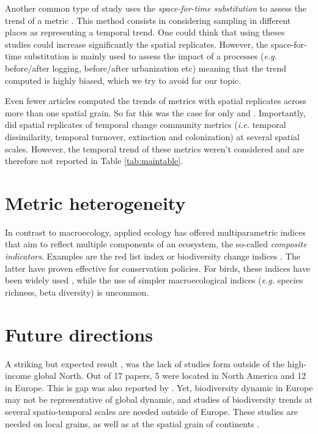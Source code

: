\documentclass[
  12pt,
  oneside]{report}
\begin{document}
Another common type of study uses the \emph{space-for-time substitution} \autocite{walker_use_2010} to assess the trend of a metric \autocite[one of the best example is][]{hill_determining_2004}. This method consists in considering sampling in different places as representing a temporal trend. One could think that using theses studies could increase significantly the spatial replicates. However, the space-for-time substitution is mainly used to assess the impact of a processes (\emph{e.g.} before/after logging, before/after urbanization etc) meaning that the trend computed is highly biased, which we try to avoid for our topic.

Even fewer articles computed the trends of metrics with spatial replicates across more than one spatial grain. So far this was the case for only \textcite{chase_species_2019} and \textcite{jarzyna_taxonomic_2018}. Importantly, \textcite{jarzyna_spatial_2015} did spatial replicates of temporal change community metrics (\emph{i.e.} temporal dissimilarity, temporal turnover, extinction and colonization) at several spatial scales. However, the temporal trend of these metrics weren't considered and are therefore not reported in Table \ref{tab:maintable}.

\hypertarget{metric-heterogeneity}{%
\chapter{Metric heterogeneity}\label{metric-heterogeneity}}

In contrast to macroecology, applied ecology has offered multiparametric indices that aim to reflect multiple components of an ecosystem, the so-called \emph{composite indicators}. Examples are the red list index \autocite{butchart_improvements_2007} or biodiversity change indices \autocite{normander_indicator_2012}. The latter have proven effective for conservation policies. For birds, these indices have been widely used \autocite[see review by][]{fraixedas_state_2020}, while the use of simpler macroecological indices (\emph{e.g.} species richness, beta diversity) is uncommon.

\hypertarget{future-directions}{%
\chapter{Future directions}\label{future-directions}}

A striking but expected result \autocite[see][]{meyer_global_2015}, was the lack of studies form outside of the high-income global North. Out of 17 papers, 5 were located in North America and 12 in Europe. This is gap was also reported by \textcite{fraixedas_state_2020}. Yet, biodiversity dynamic in Europe may not be representative of global dynamic, and studies of biodiversity trends at several spatio-temporal scales are needed outside of Europe. These studies are needed on local grains, as well as at the spatial grain of continents \autocite[\emph{e.g.} as has been done by][ for amphibians and reptiles]{alroy_current_2015}.
\end{document}
